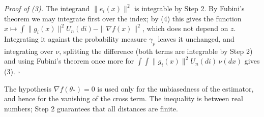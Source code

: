 \documentclass[11pt,a4paper]{report}
\begin{document}
\emph{Proof of (3).} The integrand \(\|e_i(x)\|^2\) is integrable by Step 2. By Fubini's theorem we may integrate first over the index; by (4) this gives the function \(x\mapsto\int\|g_i(x)\|^2U_n(di)-\|\nabla f(x)\|^2\), which does not depend on \(z\). Integrating it against the probability measure \(\gamma_p\) leaves it unchanged, and integrating over \(\nu\), splitting the difference (both terms are integrable by Step 2) and using Fubini's theorem once more for \(\int\!\int\|g_i(x)\|^2U_n(di)\,\nu(dx)\) gives (3). \(\square\)




The hypothesis \(\nabla f(\theta_*)=0\) is used only for the unbiasedness of the estimator, and hence for the vanishing of the cross term. The inequality is between real numbers; Step 2 guarantees that all distances are finite.
\end{document}
